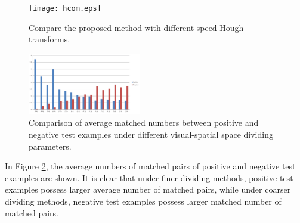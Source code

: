 \documentclass[paper]{ieice}
\begin{document}
\begin{figure}[!htbp]
\centering

\texttt{[image: hcom.eps]}


\caption[Comparison between Pyramid Match Score and Hough transform]{Compare the proposed method with different-speed Hough transforms.}
\label{fig:c5i}
\end{figure}



\begin{figure}[!htbp]
\centering

\includegraphics[width=0.44\textwidth]{ancp.eps}


\caption[Average numbers of matched pairs of positive and negative test examples]{Comparison of average matched numbers between positive and negative test examples under different visual-spatial space dividing parameters.}
\label{fig:c57}
\end{figure}


In Figure \ref{fig:c57}, the average numbers of matched pairs of positive and negative test examples are shown. It is clear that under finer dividing methods, positive test examples possess larger average number of matched pairs, while under coarser dividing methods, negative test examples possess larger matched number of matched pairs.
\end{document}
